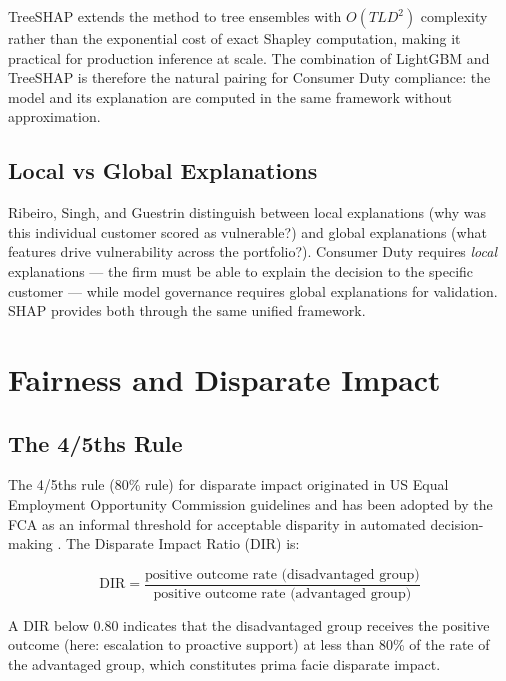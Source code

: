 \documentclass[12pt, a4paper]{article}
\begin{document}
TreeSHAP \cite{lundberg2020} extends the method to tree ensembles with
$O(TLD^2)$ complexity rather than the exponential cost of exact Shapley computation,
making it practical for production inference at scale.
The combination of LightGBM and TreeSHAP is therefore the natural pairing for
Consumer Duty compliance: the model and its explanation are computed in the same
framework without approximation.

\subsection{Local vs Global Explanations}

Ribeiro, Singh, and Guestrin \cite{ribeiro2016} distinguish between local explanations
(why was this individual customer scored as vulnerable?) and global explanations
(what features drive vulnerability across the portfolio?).
Consumer Duty requires \emph{local} explanations --- the firm must be able to
explain the decision to the specific customer --- while model governance requires
global explanations for validation.
SHAP provides both through the same unified framework.

\section{Fairness and Disparate Impact}

\subsection{The 4/5ths Rule}

The 4/5ths rule (80\% rule) for disparate impact originated in US Equal Employment
Opportunity Commission guidelines \cite{eeoc1978} and has been adopted by the FCA
as an informal threshold for acceptable disparity in automated decision-making
\cite{fca2023ai}.
The Disparate Impact Ratio (DIR) is:

\begin{equation}
    \text{DIR} = \frac{\text{positive outcome rate (disadvantaged group)}}
                      {\text{positive outcome rate (advantaged group)}}
\end{equation}

A DIR below 0.80 indicates that the disadvantaged group receives the positive
outcome (here: escalation to proactive support) at less than 80\% of the rate
of the advantaged group, which constitutes prima facie disparate impact.
\end{document}
